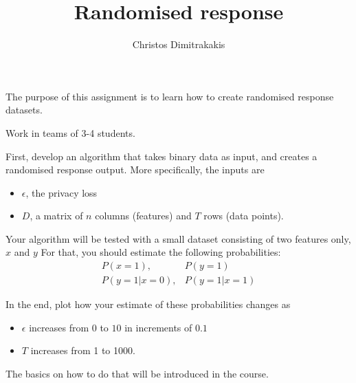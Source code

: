 \documentclass[a4paper]{article}
\title{Randomised response}
\author{Christos Dimitrakakis}
\begin{document}
\maketitle
The purpose of this assignment is to learn how to create randomised response datasets.

\begin{exercise}
  Work in teams of 3-4 students.

  First, develop an algorithm that takes binary data as input, and creates a
  randomised response output. More specifically, the inputs are
  \begin{itemize}
  \item $\epsilon$, the privacy loss
  \item $D$, a matrix of $n$ columns (features) and $T$ rows (data points).
  \end{itemize}

  Your algorithm will be tested with a small dataset consisting of two features only, $x$ and $y$
  For that, you should estimate the following probabilities:
  \begin{align}
    P(x = 1), & P(y=1)\\
    P(y = 1 | x = 0), & P(y = 1 | x =1)
  \end{align}

  In the end, plot how your estimate of these probabilities changes as
  \begin{itemize}
  \item $\epsilon$ increases from $0$ to $10$ in increments of $0.1$
  \item $T$ increases from 1 to 1000.
  \end{itemize}

  The basics on how to do that will be introduced in the course.
\end{exercise}
\end{document}
